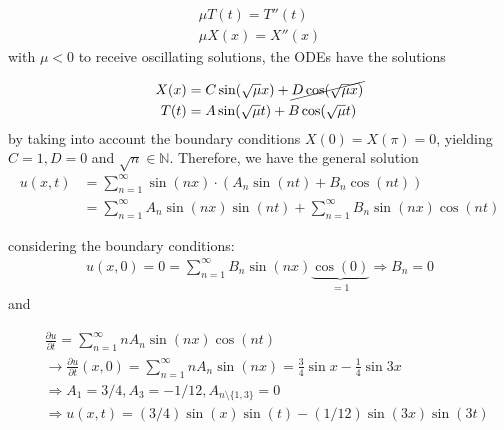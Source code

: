 \begin{align*}
    \mu T(t) = T''(t) \\
    \mu X(x) = X''(x)
\end{align*}
with $\mu < 0$ to receive oscillating solutions, the ODEs have the solutions

\begin{align*}
    X(x) & = C \sin(\sqrt\mu x)+\cancel{ D\cos(\sqrt\mu x) } \\
    T(t) & = A \sin(\sqrt\mu t)+B \cos(\sqrt\mu t)
\end{align*}
by taking into account the boundary conditions $X(0)=X(\pi)=0$, yielding $C=1,D=0$ and $\sqrt{n}\in\mathbb{N}$.
Therefore, we have the general solution
\begin{align*}
    u(x,t) & = \sum_{n=1}^\infty \sin(nx)\cdot\left( A_n\sin(nt)+B_n\cos(nt) \right) \\
    \ & = \sum_{n=1}^\infty A_n\sin(nx)\sin(nt) + \sum_{n=1}^\infty B_n\sin(nx)\cos(nt)
\end{align*}

considering the boundary conditions:
\begin{align*}
    u(x,0) = 0 = \sum_{n=1}^\infty B_n\sin(nx)\underbrace{\cos(0)}_{=1} \Rightarrow B_n=0
\end{align*}
and

\begin{align*}
    \ & \frac{\partial u}{\partial t} = \sum_{n=1}^\infty nA_n\sin(nx)\cos(nt)\\
    \ & \rightarrow \frac{\partial u}{\partial t}(x,0) = \sum_{n=1}^\infty nA_n\sin(nx) = \frac{3}{4}\sin x-\frac{1}{4}\sin 3x \\
    \ & \Rightarrow A_1=3/4, A_3=-1/12, A_{n\setminus \{1,3\}}=0 \\
    \ & \Rightarrow u(x,t)=(3/4)\sin(x)\sin(t)-(1/12)\sin(3x)\sin(3t)
\end{align*}
